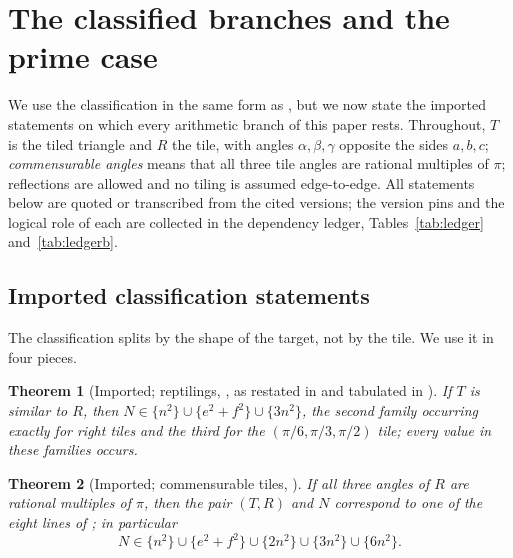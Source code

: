 \documentclass[11pt]{amsart}
\newtheorem{theorem}{Theorem}
\theoremstyle{definition}
\theoremstyle{remark}
\begin{document}
\section{The classified branches and the prime case}\label{sec:framework}

We use the classification in the same form as \cite{HarriesPrime}, but we
now state the imported statements on which every arithmetic branch of this
paper rests.  Throughout, $T$ is the tiled triangle and $R$ the tile, with
angles $\alpha,\beta,\gamma$ opposite the sides $a,b,c$; \emph{commensurable
angles} means that all three tile angles are rational multiples of $\pi$;
reflections are allowed and no tiling is assumed edge-to-edge.  All
statements below are quoted or transcribed from the cited versions; the
version pins and the logical role of each are collected in the dependency
ledger, Tables~\ref{tab:ledger} and~\ref{tab:ledgerb}.

\subsection{Imported classification statements}\label{sec:imports}

The classification splits by the shape of the target, not by the tile.  We
use it in four pieces.

\begin{theorem}[Imported; reptilings, {\cite{SWW91}}, as restated in
{\cite[Thm.~4]{BLZ633}} and tabulated in {\cite[Table~3]{Beeson7}}]
\label{thm:imp-reptile}
If $T$ is similar to $R$, then $N\in\{n^2\}\cup\{e^2+f^2\}\cup\{3n^2\}$, the
second family occurring exactly for right tiles and the third for the
$(\pi/6,\pi/3,\pi/2)$ tile; every value in these families occurs.
\end{theorem}

\begin{theorem}[Imported; commensurable tiles, {\cite[Thm.~3 and Table~3]{Beeson7}}]
\label{thm:imp-comm}
If all three angles of $R$ are rational multiples of $\pi$, then the pair
$(T,R)$ and $N$ correspond to one of the eight lines of
\cite[Table~3]{Beeson7}; in particular
\[
   N\in\{n^2\}\cup\{e^2+f^2\}\cup\{2n^2\}\cup\{3n^2\}\cup\{6n^2\}.
\]
\end{theorem}
\end{document}
